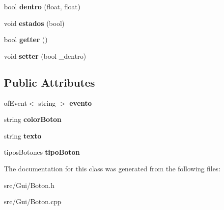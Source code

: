 \begin{DoxyCompactItemize}
\item 
\hypertarget{classboton_a2fb4e81bea8fb4367b7dc5c2e97a747b}{}bool {\bfseries dentro} (float, float)\label{classboton_a2fb4e81bea8fb4367b7dc5c2e97a747b}

\item 
\hypertarget{classboton_aaeaf90d2c85588fa211476a02216d812}{}void {\bfseries estados} (bool)\label{classboton_aaeaf90d2c85588fa211476a02216d812}

\item 
\hypertarget{classboton_a11764cdbb4e87c91f9d25c604fba8371}{}bool {\bfseries getter} ()\label{classboton_a11764cdbb4e87c91f9d25c604fba8371}

\item 
\hypertarget{classboton_aff539a42864d6fcba24af7e2ae8cb734}{}void {\bfseries setter} (bool \+\_\+dentro)\label{classboton_aff539a42864d6fcba24af7e2ae8cb734}

\end{DoxyCompactItemize}
\subsection*{Public Attributes}
\begin{DoxyCompactItemize}
\item 
\hypertarget{classboton_acd7f66034efc19d87cab127c540a75da}{}of\+Event$<$ string $>$ {\bfseries evento}\label{classboton_acd7f66034efc19d87cab127c540a75da}

\item 
\hypertarget{classboton_a944bd8256ae5c050786a562eeb725f80}{}string {\bfseries color\+Boton}\label{classboton_a944bd8256ae5c050786a562eeb725f80}

\item 
\hypertarget{classboton_a765cc553638925511282f64dbfffeee9}{}string {\bfseries texto}\label{classboton_a765cc553638925511282f64dbfffeee9}

\item 
\hypertarget{classboton_a460d5390561a0d2da31462c25912afc9}{}tipos\+Botones {\bfseries tipo\+Boton}\label{classboton_a460d5390561a0d2da31462c25912afc9}

\end{DoxyCompactItemize}


The documentation for this class was generated from the following files\+:\begin{DoxyCompactItemize}
\item 
src/\+Gui/Boton.\+h\item 
src/\+Gui/Boton.\+cpp\end{DoxyCompactItemize}
